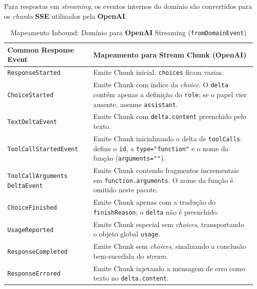 Para respostas em \textit{streaming}, os eventos internos do domínio são convertidos para os \textit{chunks} \textbf{SSE} utilizados pela \textbf{OpenAI}.

\begin{table}[H]
    \centering
    \footnotesize
    \renewcommand{\arraystretch}{1.25}
    \begin{tabularx}{\textwidth}{|>{\raggedright\arraybackslash}p{4cm}|Y|}
        \hline
        \textbf{Common Response Event} & \textbf{Mapeamento para Stream Chunk (OpenAI)} \\
        \hline
        \texttt{ResponseStarted} & Emite Chunk inicial. \texttt{choices} ficam vazias. \\
        \hline
        \texttt{ChoiceStarted} & Emite Chunk com índice da \textit{choice}. O \texttt{delta} contém apenas a definição do \texttt{role}; se o papel vier ausente, assume \texttt{assistant}. \\
        \hline
        \texttt{TextDeltaEvent} & Emite Chunk com \texttt{delta.content} preenchido pelo texto. \\
        \hline
        \texttt{ToolCallStartedEvent} & Emite Chunk inicializando o delta de \texttt{toolCalls}: define o \texttt{id}, a \texttt{type="function"} e o nome da função (\texttt{arguments=""}). \\
        \hline
        \texttt{ToolCallArguments
        DeltaEvent} & Emite Chunk contendo fragmentos incrementais em \texttt{function.arguments}. O nome da função é omitido neste pacote. \\
        \hline
        \texttt{ChoiceFinished} & Emite Chunk apenas com a tradução do \texttt{finishReason}; o \texttt{delta} não é preenchido. \\
        \hline
        \texttt{UsageReported} & Emite Chunk especial sem \textit{choices}, transportando o objeto global \texttt{usage}. \\
        \hline
        \texttt{ResponseCompleted} & Emite Chunk sem \textit{choices}, sinalizando a conclusão bem-sucedida do \textit{stream}. \\
        \hline
        \texttt{ResponseErrored} & Emite Chunk injetando a mensagem de erro como texto no \texttt{delta.content}. \\
        \hline
    \end{tabularx}
\caption{Mapeamento Inbound: Domínio para \textbf{OpenAI} Streaming (\texttt{fromDomainEvent})}
\end{table}

